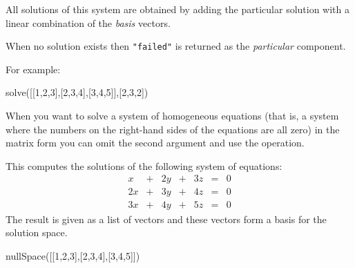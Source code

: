 {{{{{{{{{{{{All solutions of this system are obtained by adding the particular
solution with a linear combination of the
{\it basis} vectors.

When no solution exists then {\tt "failed"} is returned as the
{\it particular} component.

\begin{xtc}
\begin{xtccomment}
For example:
\end{xtccomment}
\begin{spadsrc}
solve([[1,2,3],[2,3,4],[3,4,5]],[2,3,2])
\end{spadsrc}
\begin{TeXOutput}
\begin{fricasmath}{5}
%
\end{fricasmath}
\end{TeXOutput}
\end{xtc}

When you want to solve a system of homogeneous equations (that is,
a system where the numbers on the right-hand sides of the
equations are all zero) in the matrix form you can omit the second
argument and use the  operation.

\begin{xtc}
\begin{xtccomment}
This computes the solutions of the following system of equations:
$$
\begin{array}{rcrcrcr}
  x&+&2 y&+&3 z&=&0  \\
2 x&+&3 y&+&4 z&=&0  \\
3 x&+&4 y&+&5 z&=&0
\end{array}
$$
The result is given as a list of vectors and
these vectors form a basis for the solution space.
\end{xtccomment}
\begin{spadsrc}
nullSpace([[1,2,3],[2,3,4],[3,4,5]])
\end{spadsrc}
\begin{TeXOutput}
\begin{fricasmath}{6}
%
\end{fricasmath}
\end{TeXOutput}
\end{xtc}

}}}}}}}}}}}}
